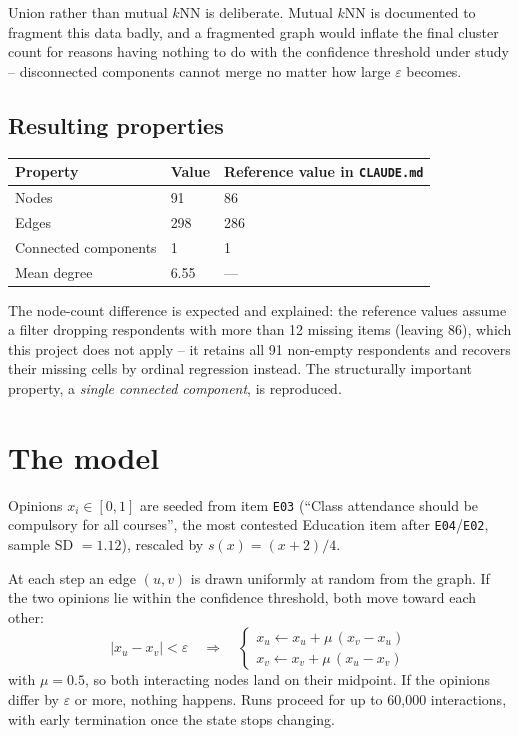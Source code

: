 \documentclass[11pt]{article}
\begin{document}
Union rather than mutual $k$NN is deliberate. Mutual $k$NN is documented to
fragment this data badly, and a fragmented graph would inflate the final
cluster count for reasons having nothing to do with the confidence threshold
under study -- disconnected components cannot merge no matter how large
$\varepsilon$ becomes.

\subsection{Resulting properties}

\begin{center}
\begin{tabularx}{\linewidth}{l l Y}
\toprule
Property & Value & Reference value in \texttt{CLAUDE.md} \\
\midrule
Nodes & 91 & 86 \\
Edges & 298 & 286 \\
Connected components & 1 & 1 \\
Mean degree & 6.55 & --- \\
\bottomrule
\end{tabularx}
\end{center}

The node-count difference is expected and explained: the reference values
assume a filter dropping respondents with more than 12 missing items (leaving
86), which this project does not apply -- it retains all 91 non-empty
respondents and recovers their missing cells by ordinal regression instead.
The structurally important property, a \emph{single connected component}, is
reproduced.

\section{The model}

Opinions $x_i \in [0,1]$ are seeded from item \texttt{E03} (``Class attendance
should be compulsory for all courses'', the most contested Education item
after \texttt{E04}/\texttt{E02}, sample SD $= 1.12$), rescaled by
$s(x) = (x+2)/4$.

At each step an edge $(u,v)$ is drawn uniformly at random from the graph. If
the two opinions lie within the confidence threshold, both move toward each
other:
\begin{equation}
|x_u - x_v| < \varepsilon
\quad\Longrightarrow\quad
\begin{cases}
x_u \leftarrow x_u + \mu\,(x_v - x_u) \\
x_v \leftarrow x_v + \mu\,(x_u - x_v)
\end{cases}
\end{equation}
with $\mu = 0.5$, so both interacting nodes land on their midpoint. If the
opinions differ by $\varepsilon$ or more, nothing happens. Runs proceed for up
to 60{,}000 interactions, with early termination once the state stops
changing.
\end{document}
